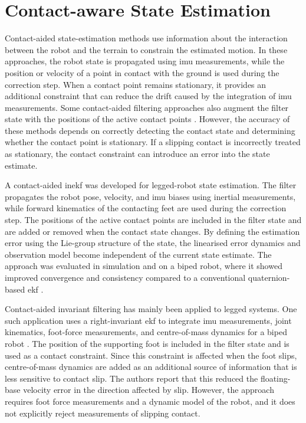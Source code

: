 \documentclass[report.tex]{subfiles}
\begin{document}
\section{Contact-aware State Estimation}
\label{sec:sota_contact_aided}

    Contact-aided state-estimation methods use information about the interaction between the robot and the terrain to constrain the estimated motion. In these approaches, the robot state is propagated using \gls{imu} measurements, while the position or velocity of a point in contact with the ground is used during the correction step. When a contact point remains stationary, it provides an additional constraint that can reduce the drift caused by the integration of \gls{imu} measurements. Some contact-aided filtering approaches also augment the filter state with the positions of the active contact points \cite{Li2023,Kim2025}. However, the accuracy of these methods depends on correctly detecting the contact state and determining whether the contact point is stationary. If a slipping contact is incorrectly treated as stationary, the contact constraint can introduce an error into the state estimate.
        
    A contact-aided \gls{inekf} was developed for legged-robot state estimation. The filter propagates the robot pose, velocity, and \gls{imu} biases using inertial measurements, while forward kinematics of the contacting feet are used during the correction step. The positions of the active contact points are included in the filter state and are added or removed when the contact state changes. By defining the estimation error using the Lie-group structure of the state, the linearised error dynamics and observation model become independent of the current state estimate. The approach was evaluated in simulation and on a biped robot, where it showed improved convergence and consistency compared to a conventional quaternion-based \gls{ekf} \cite{Hartley2018ContactAidedInEKF}.

    Contact-aided invariant filtering has mainly been applied to legged systems. One such application uses a right-invariant \gls{ekf} to integrate \gls{imu} measurements, joint kinematics, foot-force measurements, and centre-of-mass dynamics for a biped robot \cite{Li2023}. The position of the supporting foot is included in the filter state and is used as a contact constraint. Since this constraint is affected when the foot slips, centre-of-mass dynamics are added as an additional source of information that is less sensitive to contact slip. The authors report that this reduced the floating-base velocity error in the direction affected by slip. However, the approach requires foot force measurements and a dynamic model of the robot, and it does not explicitly reject measurements of slipping contact.
\end{document}
